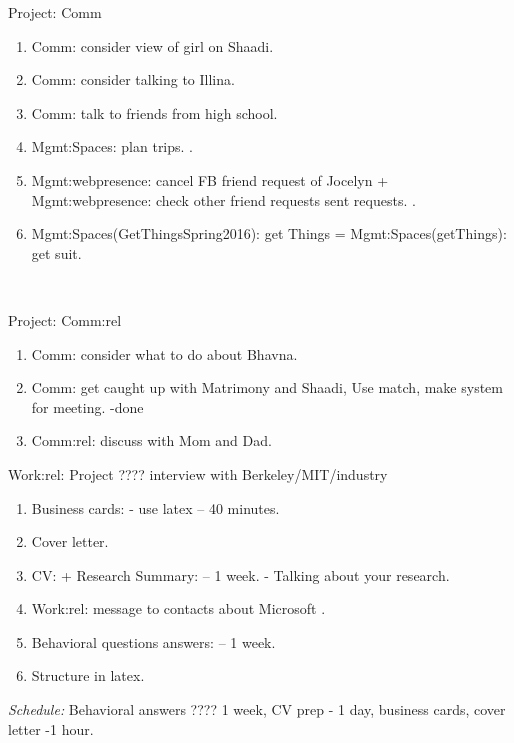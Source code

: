 {\begin{columns}
\begin{column}{0.5\columnwidth}
\begin{block}{Project: Comm}
\begin{enumerate}
\tiny \item \tiny Comm: consider view of girl on Shaadi. 
\item \tiny Comm: consider talking to Illina.
\item \tiny Comm: talk to friends from high school.
\item \tiny Mgmt:Spaces: plan trips. \te{-}.
\item \tiny Mgmt:webpresence: cancel FB friend request of Jocelyn + Mgmt:webpresence: check other friend requests
  sent requests. \te{-}. 
\item \tiny Mgmt:Spaces(GetThingsSpring2016): get Things =
  Mgmt:Spaces(getThings): get suit. 
\end{enumerate}
{}\\
\end{block}

\begin{block}{Project: Comm:rel}
\begin{enumerate} 
  \tiny \item \tiny Comm: consider what to do about Bhavna.
\item \tiny Comm: get caught up with Matrimony and Shaadi, Use match,
  make system for meeting. -done
\item \tiny Comm:rel: discuss with Mom and Dad. 
\end{enumerate}
\end{block}

\begin{block}{Work:rel: Project ???? interview with  Berkeley/MIT/industry} 
  \begin{enumerate}
    \tiny \item \tiny Business cards:  - use latex  -- 40 minutes. 
  \item \tiny Cover letter. 
  \item \tiny CV: + Research Summary:  -- 1 week.  - Talking about your
    research. 
  \item \tiny Work:rel: message to contacts about Microsoft \te{} \dl{} \pr{}. 
  \item \tiny Behavioral questions answers:    -- 1 week. 
  \item \tiny Structure in latex. 
  \end{enumerate}
{\small {\it Schedule:} Behavioral answers ???? 1 week, CV prep - 1 day,
  business cards, cover letter -1 hour. }\\ 
\end{block}
\end{column}


\end{columns}}
